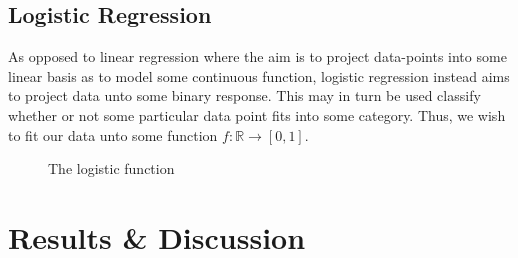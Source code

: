 \documentclass[reprint, english, nofootinbib]{revtex4-2}
\begin{document}

\subsection{Logistic Regression}
\noindent
As opposed to linear regression where the aim is to project data-points into some linear basis as to model some continuous function, logistic regression instead aims to project data unto some binary response. This may in turn be used classify whether or not some particular data point fits into some category. Thus, we wish to fit our data unto some function $f : \mathbb R \rightarrow [0, 1]$.
\begin{figure}[h!tb]
    \center
    
    \caption{The logistic function}
\end{figure}

\section{Results \& Discussion}
\end{document}
